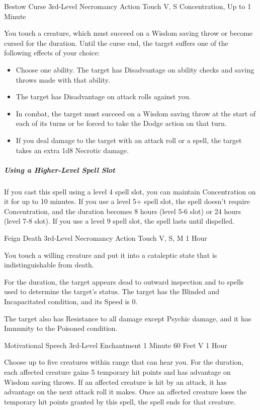 \documentclass[letterpaper,openany,oneside,twocolumn]{book}
\begin{document}
\DndSpellHeader
  {Bestow Curse}
  {3rd-Level Necromancy}
  {Action}
  {Touch}
  {V, S}
  {Concentration, Up to 1 Minute}

You touch a creature, which must succeed on a Wisdom saving throw or become cursed for the duration. Until the curse end, the target suffers one of the following effects of your choice:
\begin{itemize}
	\item Choose one ability. The target has Disadvantage on ability checks and saving throws made with that ability.
	\item The target has Disadvantage on attack rolls against you.
	\item In combat, the target must succeed on a Wisdom saving throw at the start of each of its turns or be forced to take the Dodge action on that turn.
	\item If you deal damage to the target with an attack roll or a spell, the target takes an extra 1d8 Necrotic damage.
\end{itemize}

\subparagraph*{Using a Higher-Level Spell Slot} If you cast this spell using a level 4 spell slot, you can maintain Concentration on it for up to 10 minutes. If you use a level 5+ spell slot, the spell doesn't require Concentration, and the duration becomes 8 hours (level 5-6 slot) or 24 hours (level 7-8 slot). If you use a level 9 spell slot, the spell lasts until dispelled.

\DndSpellHeader
  {Feign Death}
  {3rd-Level Necromancy}
  {Action}
  {Touch}
  {V, S, M}
  {1 Hour}

You touch a willing creature and put it into a cataleptic state that is indistinguishable from death.

For the duration, the target appears dead to outward inspection and to spells used to determine the target's status. The target has the Blinded and Incapacitated condition, and its Speed is 0.

The target also has Resistance to all damage except Psychic damage, and it has Immunity to the Poisoned condition.

\DndSpellHeader
  {Motivational Speech}
  {3rd-Level Enchantment}
  {1 Minute}
  {60 Feet}
  {V}
  {1 Hour}

Choose up to five creatures within range that can hear you. For the duration, each affected creature gains 5 temporary hit points and has advantage on Wisdom saving throws. If an affected creature is hit by an attack, it has advantage on the next attack roll it makes. Once an affected creature loses the temporary hit points granted by this spell, the spell ends for that creature.
\end{document}
